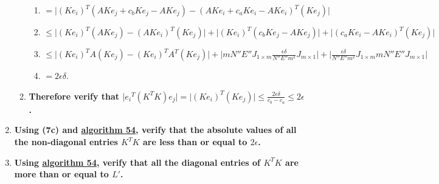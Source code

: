 \documentclass[twocolumn]{article}
\begin{document}
\begin{enumerate}
\begin{enumerate}
\begin{enumerate}
						\item $=\lvert(Ke_i)^T(AKe_j+c_bKe_j-AKe_j)-(AKe_i+c_aKe_i-AKe_i)^T(Ke_j)\rvert$
						\item $\le\lvert(Ke_i)^T(AKe_j)-(AKe_i)^T(Ke_j)\rvert+\lvert(Ke_i)^T(c_bKe_j-AKe_j)\rvert+\lvert(c_aKe_i-AKe_i)^T(Ke_j)\rvert$
						\item $\le\lvert(Ke_i)^TA(Ke_j)-(Ke_i)^TA^T(Ke_j)\rvert+\lvert mN''E''J_{1\times m}\frac{\epsilon\delta}{N''E''m^2}J_{m\times 1}\rvert+\lvert\frac{\epsilon\delta}{N''E''m^2}J_{1\times m}mN''E''J_{m\times 1}\rvert$
						\item $=2\epsilon\delta$.
					\end{enumerate}
					\item \textbf{Therefore verify that $\lvert {e_i}^T(K^TK)e_j\rvert=\lvert(Ke_i)^T(Ke_j)\rvert\le\frac{2\epsilon\delta}{c_b-c_a}\le 2\epsilon$.}
				\end{enumerate}
				\item \textbf{Using (7c) and \hyperref[sec:algorithm 54]{algorithm 54}, verify that the absolute values of all the non-diagonal entries $K^TK$ are less than or equal to $2\epsilon$.}
				\item \textbf{Using \hyperref[sec:algorithm 54]{algorithm 54}, verify that all the diagonal entries of $K^TK$ are more than or equal to $L'$.}
			\end{enumerate}
\end{document}
